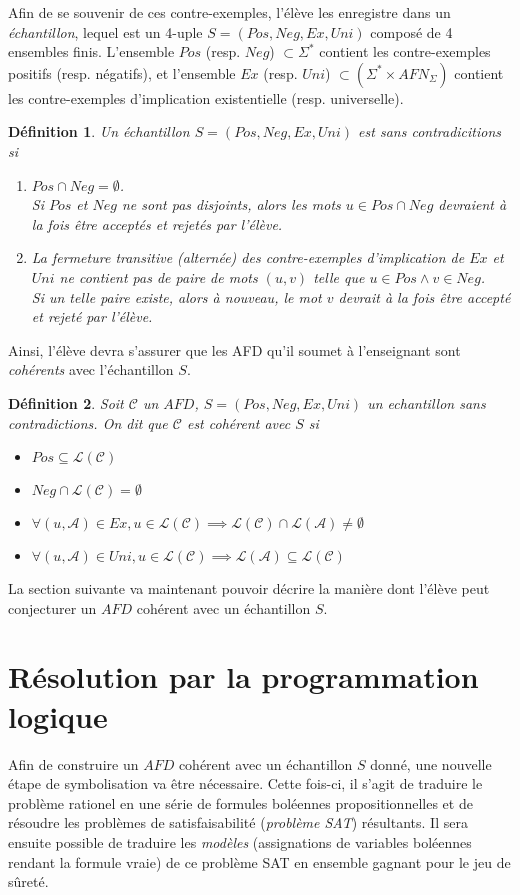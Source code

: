 \documentclass[12pt,a4paper,oneside,titlepage]{report}
\newtheorem{defi}{D\'efinition}[section]
\begin{document}
Afin de se souvenir de ces contre-exemples, l'élève les enregistre dans un \emph{échantillon}, lequel est un 4-uple $S=(Pos, Neg, Ex, Uni)$ composé de 4 ensembles finis. L'ensemble $Pos$ (resp. $Neg$) $\subset\Sigma^*$ contient les contre-exemples positifs (resp. négatifs), et l'ensemble $Ex$ (resp. $Uni$) $\subset(\Sigma^*\times AFN_\Sigma)$ contient les contre-exemples d'implication existentielle (resp. universelle).
\begin{defi}
Un échantillon $S=(Pos, Neg, Ex, Uni)$ est \emph{sans contradicitions} si \begin{enumerate}
\item $Pos\cap Neg=\emptyset$.\\ 
Si $Pos$ et $Neg$ ne sont pas disjoints, alors les mots $u\in Pos\cap Neg$ devraient à la fois être acceptés et rejetés par l'élève.
\item La fermeture transitive (alternée) des contre-exemples d'implication de $Ex$ et $Uni$ ne contient pas de paire de mots $(u,v)$ telle que $u\in Pos \land v\in Neg$.\\
Si un telle paire existe, alors à nouveau, le mot $v$ devrait à la fois être accepté et rejeté par l'élève.

\end{enumerate}
\end{defi}
\noindent Ainsi, l'élève devra s'assurer que les AFD qu'il soumet à l'enseignant sont \emph{cohérents} avec l'échantillon $S$.
\begin{defi}
\label{consistency}
Soit $\mathcal{C}$ un $AFD$, $S=(Pos, Neg, Ex, Uni)$ un echantillon sans contradictions. On dit que $\mathcal{C}$ est \emph{cohérent} avec $S$ si
\begin{itemize}
\item $Pos\subseteq \mathcal{L}(\mathcal{C})$
\item $Neg\cap \mathcal{L}(\mathcal{C})=\emptyset$
\item $\forall (u,\mathcal{A})\in Ex, u\in\mathcal{L}(\mathcal{C})\implies  \mathcal{L}(\mathcal{C})\cap \mathcal{L}(\mathcal{A})\neq\emptyset$
\item $\forall (u,\mathcal{A})\in Uni, u\in\mathcal{L}(\mathcal{C})\implies  \mathcal{L}(\mathcal{A})\subseteq \mathcal{L}(\mathcal{C})$
\end{itemize}
\end{defi}
\noindent La section suivante va maintenant pouvoir décrire la manière dont l'élève peut conjecturer un $AFD$ cohérent avec un échantillon $S$.
\section{Résolution par la programmation logique}\label{prolog}
Afin de construire un $AFD$ cohérent avec un échantillon $S$ donné, une nouvelle étape de symbolisation va être nécessaire. Cette fois-ci, il s'agit de traduire le problème rationel en une série de formules boléennes propositionnelles et de résoudre les problèmes de satisfaisabilité (\emph{problème SAT}) résultants. Il sera ensuite possible de traduire les \emph{modèles} (assignations de variables boléennes rendant la formule vraie) de ce problème SAT en ensemble gagnant pour le jeu de sûreté.
\end{document}
